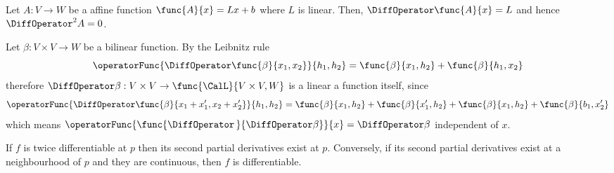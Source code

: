 \begin{example}
    Let \(A : V \to W\) be a affine function \(\func{A}{x} = Lx + b\) where \(L\) is linear. Then, \(\DiffOperator \func{A}{x} = L\) and hence \(\DiffOperator^2 A = 0\).
\end{example}

\begin{example}
    Let \(\beta : V \times V \to W\) be a bilinear function. By the Leibnitz rule
    \begin{equation*}
        \operatorFunc{\DiffOperator \func{\beta}{x_1,x_2}}{h_1,h_2} = \func{\beta}{x_1,h_2} + \func{\beta}{h_1,x_2}
    \end{equation*}
    therefore \(\DiffOperator \beta: V \times V \to \func{\CalL}{V \times V, W}\) is a linear a function itself, since
    \begin{equation*}
        \operatorFunc{\DiffOperator \func{\beta}{x_1 + x'_1,x_2 + x'_2}}{h_1,h_2} = \func{\beta}{x_1,h_2} + \func{\beta}{x'_1,h_2} + \func{\beta}{x_1,h_2} + \func{\beta}{b_1,x'_2}
    \end{equation*}
    which means \(\operatorFunc{\func{\DiffOperator \,}{\DiffOperator \beta}}{x} = \DiffOperator \beta\) independent of \(x\).
\end{example}

\begin{theorem}
    If \(f\) is twice differentiable at \(p\) then its second partial derivatives exist at \(p\). Conversely, if its second partial derivatives exist at a neighbourhood of \(p\) and they are continuous, then \(f\) is differentiable.
\end{theorem}

